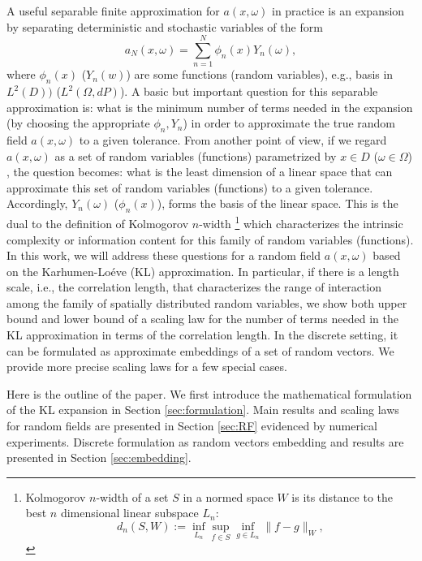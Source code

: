 \documentclass[11pt]{amsart}
\newcommand{\w}{\omega}
\newcommand{\W}{\Omega}
\begin{document}
A useful separable finite approximation for $a(x,\w)$ in practice is an expansion by separating deterministic and stochastic variables of the form
\begin{equation}
\label{eq:1}
a_N(x,\w)=\sum_{n=1}^{N}\phi_n(x)Y_n(\w),
\end{equation}
where $\phi_n(x)$ ($Y_n(w)$) are some functions (random variables), e.g., basis in $L^2(D))$ ($L^2(\W,dP)$). A basic but important question for this separable approximation is: what is the minimum number of terms needed in the expansion (by choosing the appropriate $\phi_n, Y_n$) in order to approximate the true random field $a(x,\w)$ to a given tolerance. From another point of view, if we regard $a(x,\w)$ as a set of random variables (functions) parametrized by $x\in D$ ($\w\in \W$) , the question becomes: what is the least dimension of a linear space that can approximate this set of random variables (functions) to a given tolerance. Accordingly, $Y_n(\w)$ ($\phi_n(x)$), forms the basis of the linear space. This is the dual to the definition of Kolmogorov $n$-width
\footnote{Kolmogorov $n$-width of a set $S$ in a normed space $W$ is its distance to the best $n$ dimensional linear subspace $L_n$:
\[
d_n(S, W) :=\inf_{L_n}\sup_{f\in S}\inf_{g\in L_n} \|f-g\|_W, 
\]
} \cite{kolmogoroff1936uber}
which characterizes the intrinsic complexity or information content  for this family of random variables (functions).
In this work, we will address these questions for a random field $a(x,\w)$ based on the Karhumen-Lo\'{e}ve (KL) approximation. In particular, if there is a length scale, i.e., the correlation length, that characterizes the range of interaction among the family of spatially distributed random variables, we show both upper bound and lower bound of a scaling law for the number of terms needed in the KL approximation in terms of the correlation length. In the discrete setting, it can be formulated as approximate embeddings of a set of random vectors. We provide more precise scaling laws for a few special cases.


Here is the outline of the paper. We first introduce the mathematical formulation of the KL expansion in Section \ref{sec:formulation}. Main results and scaling laws for random fields are presented in Section \ref{sec:RF} evidenced by numerical experiments. Discrete formulation as random vectors embedding and results are presented in Section \ref{sec:embedding}.
\end{document}

